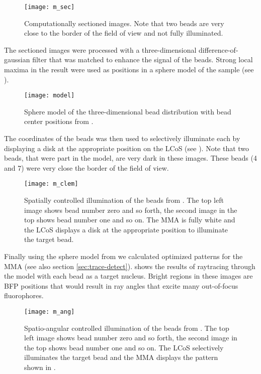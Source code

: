 \begin{figure}[H]
  \centering
  \texttt{[image: m\_sec]}
  \caption{Computationally sectioned images. Note that two beads are
    very close to the border of the field of view and not fully
    illuminated.}
  \label{fig:m_sec}
\end{figure}

The sectioned images were processed with a three-dimensional
difference-of-gaussian filter that was matched to enhance the signal
of the beads. Strong local maxima in the result were used as positions
in a sphere model of the sample (see ).

\begin{figure}[H]
  \centering
  \texttt{[image: model]}
  \caption{Sphere model of the three-dimensional bead distribution
    with bead center positions from .}
  \label{fig:model}
\end{figure}


The coordinates of the beads was then used to selectively illuminate
each by displaying a disk at the appropriate position on the LCoS (see
). Note that two beads, that were part in the
model, are very dark in these images. These beads (4 and 7) were very
close the border of the field of view.

\begin{figure}[H]
  \centering
  \texttt{[image: m\_clem]}
  \caption{Spatially controlled illumination of the beads from
    . The top left image shows bead number zero and
    so forth, the second image in the top shows bead number one and so
    on. The MMA is fully white and the LCoS displays a disk at the
    appropriate position to illuminate the target bead.}
  \label{fig:m_clem}
\end{figure}


Finally using the sphere model from  we calculated
optimized patterns for the MMA (see also section
\ref{sec:trace-detect}).  shows the results of
raytracing through the model with each bead as a target
nucleus. Bright regions in these images are BFP positions that would
result in ray angles that excite many out-of-focus fluorophores. 

\begin{figure}[H]
  \centering
  \texttt{[image: m\_ang]}
  \caption{Spatio-angular controlled illumination of the beads from
    . The top left image shows bead number zero and
    so forth, the second image in the top shows bead number one and so
    on. The LCoS selectively illuminates the target bead and the MMA
    displays the pattern shown in .}
  \label{fig:m_ang}
\end{figure}



